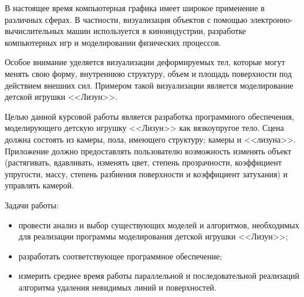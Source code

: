 
В настоящее время компьютерная графика имеет широкое применение в
различных сферах. В частности, визуализация объектов с помощью электронно-вычислительных машин используется в киноиндустрии, разработке компьютерных
игр и моделировании физических процессов.

Особое внимание уделяется визуализации деформируемых тел, которые
могут менять свою форму, внутреннюю структуру, объем и площадь поверхности
под действием внешних сил. Примером такой визуализации является моделирование детской игрушки <<Лизун>>.

Целью данной курсовой работы является разработка программного обеспечения, моделирующего детскую игрушку <<Лизун>> как вязкоупругое тело. Сцена должна состоять из камеры, пола, имеющего структуру; камеры и <<лизуна>>. Приложение должно предоставлять пользователю возможность изменять объект (растягивать, вдавливать, изменять цвет, степень прозрачности, коэффициент упругости, массу, степень разбиения поверхности и коэффициент затухания) и управлять камерой.

Задачи работы:
\begin{itemize}
	\item провести анализ и выбор существующих моделей и алгоритмов, необходимых для реализации программы моделирования детской игрушки <<Лизун>>;
	\item разработать соответствующее программное обеспечение;
	\item измерить среднее время работы параллельной и последовательной реализаций алгоритма удаления невидимых линий и поверхностей.
\end{itemize}

\clearpage
